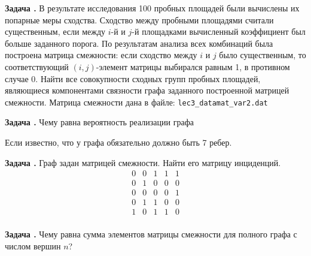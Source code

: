 \documentclass[12pt, a4paper]{article}
\newcounter{tasknum}
\newcommand{\task}{\addtocounter{tasknum}{1}
\textbf{Задача \arabic{tasknum}.\,\,}}
\begin{document}
\task В результате исследования 100 пробных площадей были вычислены их попарные меры сходства. 
Сходство между пробными площадями считали существенным, если между $i$-й и $j$-й площадками
вычисленный коэффициент был больше заданного порога. По результатам анализа всех комбинаций была
построена матрица смежности: если сходство между $i$ и $j$ было существенным, то соответствующий $(i,j)$-элемент
матрицы выбирался равным 1, в противном случае 0. Найти все совокупности сходных групп пробных площадей, являющиеся
компонентами связности графа заданного построенной матрицей смежности. Матрица смежности дана в файле: 
\texttt{lec3\_datamat\_var2.dat}


\task Чему равна вероятность реализации графа
\begin{figure}[H]
\centering
{}
\end{figure}
Если известно, что у графа обязательно должно быть 7 ребер. 


\task Граф задан матрицей смежности. Найти его матрицу инциденций.
$$
\begin{array}{lllll}
0 & 0 & 1 & 1 & 1\\
0 & 1 & 0 & 0 & 0\\
0 & 0 & 0 & 0 & 1\\
0 & 1 & 1 & 0 & 0\\
1 & 0 & 1 & 1 & 0\\
\end{array}
$$


\task Чему равна сумма элементов матрицы смежности для полного графа с числом вершин $n$? 
 

 
 
\end{document}
